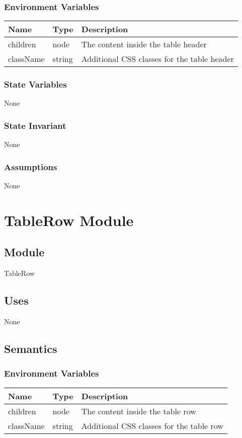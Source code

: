 \documentclass[12pt]{article}
\begin{document}
\subsubsection{Environment Variables}
\begin{tabular}{| l | l | p{10cm} |}
    \hline
    \textbf{Name} & \textbf{Type} & \textbf{Description}\\ \hline
    children & node & The content inside the table header\\ \hline
    className & string & Additional CSS classes for the table header\\ \hline
\end{tabular}

\subsubsection{State Variables}
None

\subsubsection{State Invariant}
None

\subsubsection{Assumptions}
None

\newpage


\section{TableRow Module}

\subsection{Module}
TableRow

\subsection{Uses}
None

\subsection{Semantics}

\subsubsection{Environment Variables}
\begin{tabular}{| l | l | p{10cm} |}
    \hline
    \textbf{Name} & \textbf{Type} & \textbf{Description}\\ \hline
    children & node & The content inside the table row\\ \hline
    className & string & Additional CSS classes for the table row\\ \hline
\end{tabular}
\end{document}

